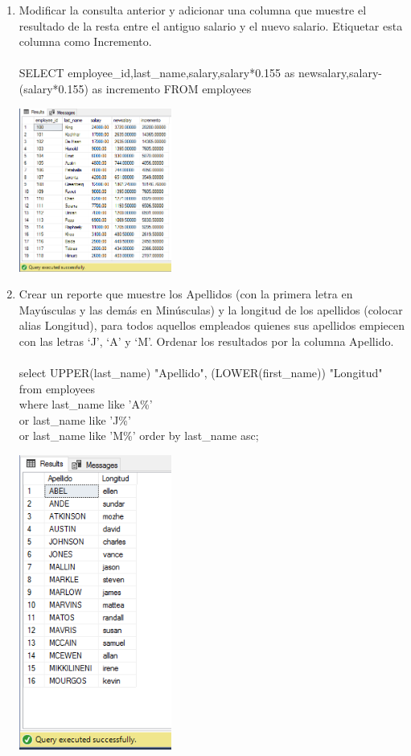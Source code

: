 \begin{enumerate}[1.]
	\item Modificar la consulta anterior y adicionar una columna que muestre el resultado de la resta entre el antiguo salario y el nuevo salario. Etiquetar esta columna como Incremento.
	\\
	\\SELECT employee\_id,last\_name,salary,salary*0.155 as newsalary,salary-(salary*0.155) as incremento FROM employees
	\begin{center}
	\includegraphics[width=5cm]{./Imagenes/actividad_05_03}
	\end{center}

	\item Crear un reporte que muestre los Apellidos (con la primera letra en May\'usculas y las demás en Min\'usculas) y la longitud de los apellidos (colocar alias Longitud), para todos aquellos empleados quienes sus apellidos empiecen con las letras ‘J’, ‘A’ y ‘M’. Ordenar los resultados por la columna Apellido.
	\\
	\\select UPPER(last\_name) "Apellido", (LOWER(first\_name)) "Longitud" 
	\\from employees 
	\\where last\_name like 'A\%'
     	\\ or last\_name like 'J\%'
      	\\or last\_name like 'M\%' order by last\_name asc;
      	\begin{center}
	\includegraphics[width=5cm]{./Imagenes/actividad_05_04}
	\end{center}


\end{enumerate}
